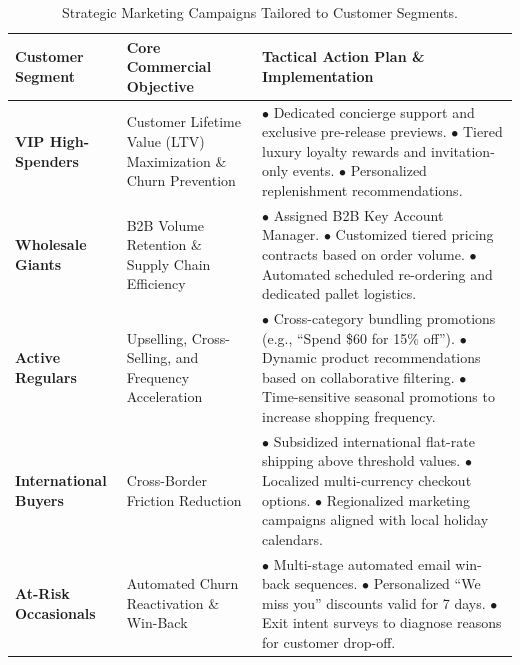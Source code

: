 \documentclass[11pt,a4paper]{article}
\begin{document}
\begin{table}[H]
\centering
\small
\caption{Strategic Marketing Campaigns Tailored to Customer Segments.}
\label{tab:business_strategies}
\begin{tabularx}{\textwidth}{l p{4.2cm} X}
\toprule
\textbf{Customer Segment} & \textbf{Core Commercial Objective} & \textbf{Tactical Action Plan \& Implementation} \\
\midrule
\textbf{VIP High-Spenders} & Customer Lifetime Value (LTV) Maximization \& Churn Prevention & 
$\bullet$ Dedicated concierge support and exclusive pre-release previews.\newline
$\bullet$ Tiered luxury loyalty rewards and invitation-only events.\newline
$\bullet$ Personalized replenishment recommendations. \\
\midrule
\textbf{Wholesale Giants} & B2B Volume Retention \& Supply Chain Efficiency & 
$\bullet$ Assigned B2B Key Account Manager.\newline
$\bullet$ Customized tiered pricing contracts based on order volume.\newline
$\bullet$ Automated scheduled re-ordering and dedicated pallet logistics. \\
\midrule
\textbf{Active Regulars} & Upselling, Cross-Selling, and Frequency Acceleration & 
$\bullet$ Cross-category bundling promotions (e.g., ``Spend \$60 for 15\% off'').\newline
$\bullet$ Dynamic product recommendations based on collaborative filtering.\newline
$\bullet$ Time-sensitive seasonal promotions to increase shopping frequency. \\
\midrule
\textbf{International Buyers} & Cross-Border Friction Reduction & 
$\bullet$ Subsidized international flat-rate shipping above threshold values.\newline
$\bullet$ Localized multi-currency checkout options.\newline
$\bullet$ Regionalized marketing campaigns aligned with local holiday calendars. \\
\midrule
\textbf{At-Risk Occasionals} & Automated Churn Reactivation \& Win-Back & 
$\bullet$ Multi-stage automated email win-back sequences.\newline
$\bullet$ Personalized ``We miss you'' discounts valid for 7 days.\newline
$\bullet$ Exit intent surveys to diagnose reasons for customer drop-off. \\
\bottomrule
\end{tabularx}
\end{table}
\end{document}
